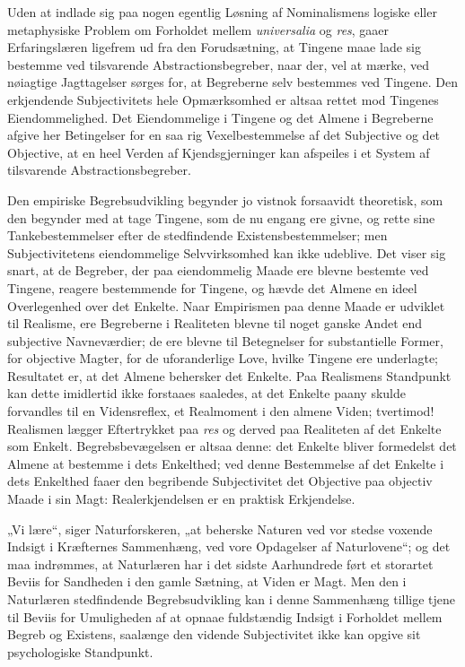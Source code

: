 \documentclass[11pt]{book}
\newcommand{\opage}[1]{\marginnote{\footnotesize\textit{[#1]}}}
\begin{document}
\opage{195} \setcounter{footnote}{0}%
Uden at indlade sig paa nogen egentlig Løsning af Nominalismens logiske
eller metaphysiske Problem om Forholdet mellem \textit{universalia} og
\textit{res}, gaaer Erfaringslæren ligefrem ud fra den Forudsætning, at
Tingene maae lade sig bestemme ved tilsvarende Abstractionsbegreber,
naar der, vel at mærke, ved nøiagtige Jagttagelser sørges for, at
Begreberne selv bestemmes ved Tingene. Den erkjendende Subjectivitets
hele Opmærksomhed er altsaa rettet mod Tingenes Eiendommelighed. Det
Eiendommelige i Tingene og det Almene i Begreberne afgive her
Betingelser for en saa rig Vexelbestemmelse af det Subjective og det
Objective, at en heel Verden af Kjendsgjerninger kan afspeiles i et
System af tilsvarende Abstractionsbegreber.

Den empiriske Begrebsudvikling begynder jo vistnok forsaavidt
theoretisk, som den begynder med at tage Tingene, som de nu engang ere
givne, og rette sine Tankebestemmelser efter de stedfindende
Existensbestemmelser; men Subjectivitetens eiendommelige
Selvvirksomhed kan ikke udeblive. Det viser sig snart, at de Begreber,
der paa eiendommelig Maade ere blevne bestemte ved Tingene, reagere
bestemmende for Tingene, og hævde det Almene en ideel Overlegenhed over
det Enkelte. Naar Empirismen paa denne Maade er udviklet til Realisme,
ere Begreberne i Realiteten blevne til noget ganske Andet end subjective
Navneværdier; de ere blevne til Betegnelser for substantielle Former,
for objective Magter, for de uforanderlige Love, hvilke Tingene ere
underlagte; Resultatet er, at det Almene behersker det Enkelte. Paa
Realismens Standpunkt kan dette imidlertid ikke forstaaes saaledes, at
det Enkelte paany skulde forvandles til en Vidensreflex, et Realmoment
i den almene Viden; tvertimod! Realismen lægger Eftertrykket paa
\textit{res} og derved paa Realiteten af det Enkelte som Enkelt.
Begrebsbevægelsen er altsaa denne: det Enkelte bliver formedelst det
Almene at bestemme i dets Enkelthed; ved denne Bestemmelse af det
Enkelte i dets Enkelthed faaer den begribende
\opage{196} \setcounter{footnote}{0}%
Subjectivitet det Objective paa objectiv Maade i sin Magt:
Realerkjendelsen er en praktisk Erkjendelse.

„Vi lære“, siger Naturforskeren, „at beherske Naturen ved vor stedse
voxende Indsigt i Kræfternes Sammenhæng, ved vore Opdagelser af
Naturlovene“; og det maa indrømmes, at Naturlæren har i det sidste
Aarhundrede ført et storartet Beviis for Sandheden i den gamle Sætning,
at Viden er Magt. Men den i Naturlæren stedfindende Begrebsudvikling
kan i denne Sammenhæng tillige tjene til Beviis for Umuligheden af at
opnaae fuldstændig Indsigt i Forholdet mellem Begreb og Existens,
saalænge den vidende Subjectivitet ikke kan opgive sit psychologiske
Standpunkt.
\end{document}
